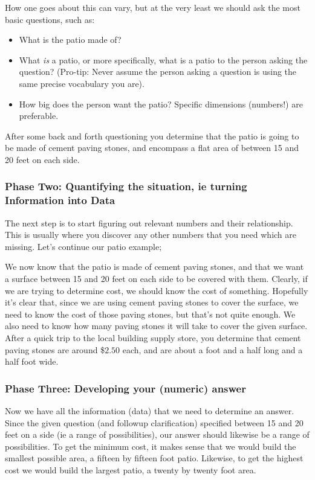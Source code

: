 How one goes about this can vary, but at the very least we should ask the most basic questions, such as:
\begin{itemize}
\item What is the patio made of?
\item What \textit{is} a patio, or more specifically, what is a patio to the person asking the question? (Pro-tip: Never assume the person asking a question is using the same precise vocabulary you are).
\item How big does the person want the patio? Specific dimensions (numbers!) are preferable.
\end{itemize}

After some back and forth questioning you determine that the patio is going to be made of cement paving stones, and encompass a flat area of between 15 and 20 feet on each side.

\subsubsection*{Phase Two: Quantifying the situation, ie turning Information into Data}

The next step is to start figuring out relevant numbers and their relationship. This is usually where you discover any other numbers that you need which are missing. Let's continue our patio example;

We now know that the patio is made of cement paving stones, and that we want a surface between 15 and 20 feet on each side to be covered with them. Clearly, if we are trying to determine cost, we should know the cost of something. Hopefully it's clear that, since we are using cement paving stones to cover the surface, we need to know the cost of those paving stones, but that's not quite enough. We also need to know how many paving stones it will take to cover the given surface. After a quick trip to the local building supply store, you determine that cement paving stones are around \$$2.50$ each, and are about a foot and a half long and a half foot wide.

\subsubsection*{Phase Three: Developing your (numeric) answer}

Now we have all the information (data) that we need to determine an answer. Since the given question (and followup clarification) specified between 15 and 20 feet on a side (ie a range of possibilities), our answer should likewise be a range of possibilities. To get the minimum cost, it makes sense that we would build the smallest possible area, a fifteen by fifteen foot patio. Likewise, to get the highest cost we would build the largest patio, a twenty by twenty foot area.

